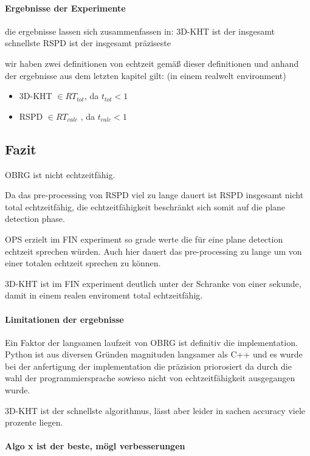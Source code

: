 \documentclass[main.tex]{subfiles}
\begin{document}
\paragraph{Ergebnisse der Experimente }
die ergebnisse lassen sich zusammenfassen in:
3D-KHT ist der insgesamt schnellste
RSPD ist der insgesamt präziseste
 
wir haben zwei definitionen von echtzeit
gemäß dieser definitionen und anhand der ergebnisse aus dem letzten kapitel gilt:
(in einem realwelt environment)
\begin{itemize}
    \item 3D-KHT $\in RT_{tot}$, da $t_{tot} < 1$
    \item RSPD $\in RT_{calc}$ , da $t_{calc}< 1$
\end{itemize}

\subsection{Fazit}

OBRG ist nicht echtzeitfähig.

Da das pre-processing von RSPD viel zu lange dauert ist RSPD insgesamt nicht total echtzeitfähig,
die echtzeitfähigkeit beschränkt sich somit auf die plane detection phase.

OPS erzielt im FIN experiment so grade werte die für eine plane detection echtzeit sprechen würden.
Auch hier dauert das pre-processing zu lange um von einer totalen echtzeit sprechen zu können.

3D-KHT ist im FIN experiment deutlich unter der Schranke von einer sekunde, damit in einem realen 
enviroment total echtzeitfähig. 


\paragraph{Limitationen der ergebnisse}
Ein Faktor der langsamen laufzeit von OBRG ist definitiv die implementation. Python ist aus diversen
Gründen magnituden langsamer als C++ und es wurde bei der anfertigung der implementation die 
präzision priorosiert da durch die wahl der programmiersprache sowieso nicht von echtzeitfähigkeit 
ausgegangen wurde.

3D-KHT ist der schnellste algorithmus, lässt aber leider in sachen accuracy viele prozente liegen.

\paragraph{Algo x ist der beste, mögl verbesserungen}
\end{document}
